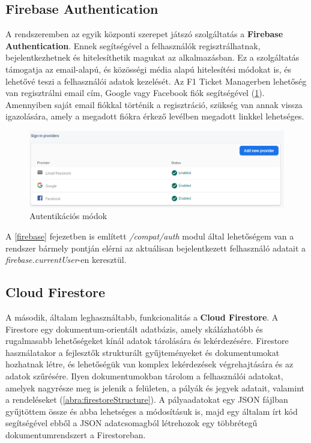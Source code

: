 \subsection {Firebase Authentication}

A rendszeremben az egyik központi szerepet játszó szolgáltatás a \textbf{Firebase Authentication}. Ennek segítségével a felhasználók regisztrálhatnak, bejelentkezhetnek és hitelesíthetik magukat az alkalmazásban. Ez a szolgáltatás támogatja az email-alapú, és közösségi média alapú hitelesítési módokat is, és lehetővé teszi a felhasználói adatok kezelését. Az F1 Ticket Managerben lehetőség van regisztrálni email cím, Google vagy Facebook fiók segítségével (\ref{abra:loginMethods}). Amennyiben saját email fiókkal történik a regisztráció, szükség van annak vissza igazolására, amely a megadott fiókra érkező levélben megadott linkkel lehetséges.

\begin{figure}[!h]
	\centering
	\includegraphics[scale=0.4]{images/loginMethods}
	\caption{Autentikációs módok}
	\label{abra:loginMethods}
\end{figure}

A \ref{firebase} fejezetben is említett \textit{/compat/auth} modul által lehetőségem van a rendszer bármely pontján elérni az aktuálisan bejelentkezett felhasználó adatait a \textit{firebase.currentUser}-en keresztül.

\subsection {Cloud Firestore}

A második, általam leghasználtabb, funkcionalitás a \textbf{Cloud Firestore}. A Firestore egy dokumentum-orientált adatbázis, amely skálázhatóbb és rugalmasabb lehetőségeket kínál adatok tárolására és lekérdezésére. Firestore használatakor a fejlesztők strukturált gyűjteményeket és dokumentumokat hozhatnak létre, és lehetőségük van komplex lekérdezések végrehajtására és az adatok szűrésére. Ilyen dokumentumokban tárolom a felhasználói adatokat, amelyek nagyrésze meg is jelenik a felületen, a pályák és jegyek adatait, valamint a rendeléseket (\ref{abra:firestoreStructure}). A pályaadatokat egy JSON fájlban gyűjtöttem össze és abba lehetséges a módosításuk is, majd egy általam írt kód segítségével ebből a JSON adatcsomagból létrehozok egy többrétegű dokumentumrendszert a Firestoreban.

